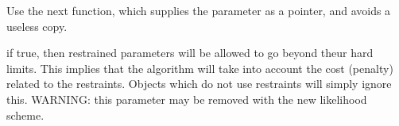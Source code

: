 
\begin{DoxyRefList}
\item[Member \mbox{\hyperlink{class_obj_cryst_1_1_refinable_obj_a0c0050a3d3141ca34eb8f4b559ad2f8d}{Obj\+Cryst::Refinable\+Obj::Add\+Par}} (const \mbox{\hyperlink{class_obj_cryst_1_1_refinable_par}{Refinable\+Par}} \&new\+Ref\+Par)]\label{deprecated__deprecated000001}%
%
Use the next function, which supplies the parameter as a pointer, and avoids a useless copy.  
\item[Member \mbox{\hyperlink{class_obj_cryst_1_1_refinable_obj_a55da6256532023f40769c79eef074703}{Obj\+Cryst::Refinable\+Obj::Begin\+Optimization}} (const bool allow\+Approximations=false, const bool enable\+Restraints=false)]\label{deprecated__deprecated000002}%
%
if true, then restrained parameters will be allowed to go beyond theur hard limits. This implies that the algorithm will take into account the cost (penalty) related to the restraints. Objects which do not use restraints will simply ignore this. W\+A\+R\+N\+I\+NG\+: this parameter may be removed with the new likelihood scheme. 
\end{DoxyRefList}